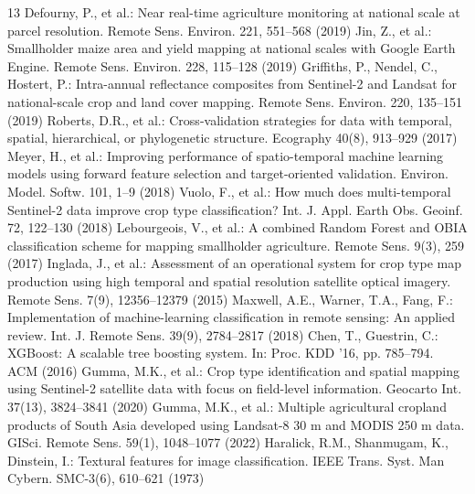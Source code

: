 \documentclass[runningheads]{llncs}
\begin{document}
\begin{thebibliography}{13}
 Defourny, P., et al.: Near real-time agriculture monitoring at national scale at parcel resolution. Remote Sens. Environ. 221, 551--568 (2019)
 Jin, Z., et al.: Smallholder maize area and yield mapping at national scales with Google Earth Engine. Remote Sens. Environ. 228, 115--128 (2019)
 Griffiths, P., Nendel, C., Hostert, P.: Intra-annual reflectance composites from Sentinel-2 and Landsat for national-scale crop and land cover mapping. Remote Sens. Environ. 220, 135--151 (2019)
 Roberts, D.R., et al.: Cross-validation strategies for data with temporal, spatial, hierarchical, or phylogenetic structure. Ecography 40(8), 913--929 (2017)
 Meyer, H., et al.: Improving performance of spatio-temporal machine learning models using forward feature selection and target-oriented validation. Environ. Model. Softw. 101, 1--9 (2018)
 Vuolo, F., et al.: How much does multi-temporal Sentinel-2 data improve crop type classification? Int. J. Appl. Earth Obs. Geoinf. 72, 122--130 (2018)
 Lebourgeois, V., et al.: A combined Random Forest and OBIA classification scheme for mapping smallholder agriculture. Remote Sens. 9(3), 259 (2017)
 Inglada, J., et al.: Assessment of an operational system for crop type map production using high temporal and spatial resolution satellite optical imagery. Remote Sens. 7(9), 12356--12379 (2015)
 Maxwell, A.E., Warner, T.A., Fang, F.: Implementation of machine-learning classification in remote sensing: An applied review. Int. J. Remote Sens. 39(9), 2784--2817 (2018)
 Chen, T., Guestrin, C.: XGBoost: A scalable tree boosting system. In: Proc. KDD '16, pp. 785--794. ACM (2016)
 Gumma, M.K., et al.: Crop type identification and spatial mapping using Sentinel-2 satellite data with focus on field-level information. Geocarto Int. 37(13), 3824--3841 (2020)
 Gumma, M.K., et al.: Multiple agricultural cropland products of South Asia developed using Landsat-8 30 m and MODIS 250 m data. GISci. Remote Sens. 59(1), 1048--1077 (2022)
 Haralick, R.M., Shanmugam, K., Dinstein, I.: Textural features for image classification. IEEE Trans. Syst. Man Cybern. SMC-3(6), 610--621 (1973)
\end{thebibliography}
\end{document}
